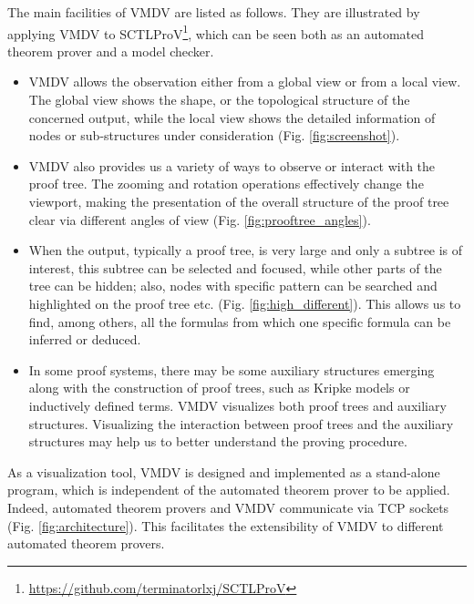 \documentclass[runningheads]{llncs}
\newcommand\tool[1]{\textsf{#1}}
\newcommand\vmdv{\tool{VMDV}}
\newcommand\couic[1]{}
\begin{document}
The main facilities of \vmdv{} are listed as follows.
They are illustrated by applying \vmdv{} to \textsf{SCTLProV}\footnote{\url{https://github.com/terminatorlxj/SCTLProV}},
which can be seen both as an automated theorem prover and a model checker.

\begin{itemize}
\item
\vmdv{} allows the observation either from a global view or from a local view. 
The global view shows the shape, or the topological structure of the concerned output,
while the local view shows the detailed information of nodes or sub-structures under consideration
(Fig. \ref{fig:screenshot}). 

\item
\vmdv{} also provides us a variety of ways to observe or interact with the proof tree. 
The zooming and rotation operations effectively change the viewport, making the presentation of the overall structure of the proof tree clear via different angles of view (Fig. \ref{fig:prooftree_angles}).

\item
When the output, typically a proof tree, is very large and only a subtree is of interest, 
this subtree can be selected and focused, while other parts of the tree can be hidden; 
also, nodes with specific pattern can be searched and highlighted on the proof tree etc. (Fig. \ref{fig:high_different}). 
This allows us to find, among others, all the formulas from which one specific formula can be inferred or deduced.
\couic{
The same scenario holds in the setting of model checking (Fig. \ref{fig:state_angles}).
}
 
\item
In some proof systems, there may be some auxiliary structures emerging along with the construction of proof trees, 
such as Kripke models or inductively defined terms. 
\vmdv{} visualizes both proof trees and auxiliary structures.
Visualizing the interaction between proof trees and the auxiliary structures may help us to better understand the proving procedure.
\end{itemize}

As a visualization tool, \vmdv{} is designed and implemented as a stand-alone program, 
which is independent of the automated theorem prover to be applied.
Indeed, automated theorem provers and \vmdv{} communicate via TCP sockets (Fig. \ref{fig:architecture}). 
This facilitates the extensibility of \vmdv{} to different automated theorem provers. 
\smallskip
\end{document}

